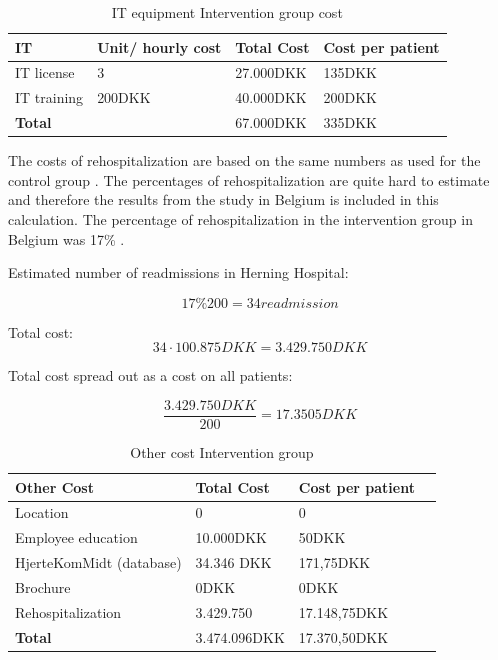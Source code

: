 \begin{table}[H]
\begin{longtabu} to \linewidth{l l l l }
    \textbf{IT} & \textbf{Unit/ hourly cost} &\textbf{Total Cost} & \textbf{Cost per patient} \\[-1ex]
    \midrule
    IT license  & 3  & 27.000DKK  & 135DKK  \\ \hline
    IT training & 200DKK & 40.000DKK & 200DKK \\
    \hline \hline \hline
    \textbf{Total} &  & 67.000DKK & 335DKK
    \newline
    \newline
   \end{longtabu}
\caption{IT equipment Intervention group cost}
\label{tab: II}
\end{table}

The costs of rehospitalization are based on the same numbers as used for the control group \cite{hjertetal, rasmussen2011hjerterehabilitering}. The percentages of rehospitalization are quite hard to estimate and therefore the results from the study in Belgium is included in this calculation. The percentage of rehospitalization in the intervention group in Belgium was 17\% \cite{costeffect}.

Estimated number of readmissions in Herning Hospital:


$$17\%200= 34 readmission$$

Total cost:
$$34\cdot100.875DKK=3.429.750DKK$$

Total cost spread out as a cost on all patients:

$$\frac{3.429.750DKK}{200}=17.3505DKK$$

\begin{table}[H]
\begin{longtabu} to 
    \textbf{Other Cost} &\textbf{Total Cost} & \textbf{Cost per patient} \\[-1ex]
    \midrule
    Location   &  0 & 0 \\ \hline
    Employee education   & 10.000DKK & 50DKK  \\ \hline
    HjerteKomMidt (database) & 34.346 DKK &   171,75DKK \\ \hline
    Brochure & 0DKK & 0DKK \\ \hline
    Rehospitalization & 3.429.750 & 17.148,75DKK \\
    \hline \hline \hline
    \textbf{Total} & 3.474.096DKK  & 17.370,50DKK
    \newline
    \newline
   \end{longtabu}
\caption{Other cost Intervention group }
\label{tab: OI}
\end{table}

